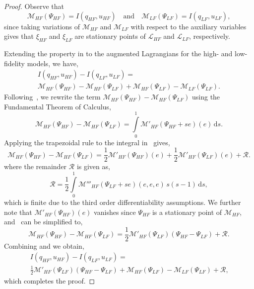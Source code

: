 \begin{proof}
%
Observe that
%
\begin{equation}
\label{eq:MeqI}
\mathcal{M}_{HF}(\Psi_{HF})=I(q_{HF},u_{HF})\quad\textrm{and}\quad\mathcal{M}_{LF}(\Psi_{LF})=I(q_{LF},u_{LF}),
\end{equation}
%
since taking variations of $\mathcal{M}_{HF}$ and $\mathcal{M}_{LF}$ with respect to the auxiliary variables gives that $\xi_{HF}$ and $\xi_{LF}$ are stationary points of $\mathcal{L}_{HF}$ and $\mathcal{L}_{LF}$, respectively.

Extending the property in  to the augmented Lagrangians for the high- and low-fidelity models, we have,
%
\begin{multline}
\label{eq:repIwithM}
I(q_{HF},u_{HF})-I(q_{LF},u_{LF})=\\\mathcal{M}_{HF}(\Psi_{HF})-\mathcal{M}_{HF}(\Psi_{LF})+\mathcal{M}_{HF}(\Psi_{LF})-\mathcal{M}_{LF}(\Psi_{LF})\textrm{.}
\end{multline}
%
Following~\cite{BecVex05}, we rewrite the term $\mathcal{M}_{HF}(\Psi_{HF})-\mathcal{M}_{HF}(\Psi_{LF})$ using the Fundamental Theorem of Calculus,
%
\begin{equation}
\label{eq:Mantiderivative}
\mathcal{M}_{HF}(\Psi_{HF})-\mathcal{M}_{HF}(\Psi_{LF}) = \int\limits_{0}^{1} \mathcal{M}'_{HF}\left(\Psi_{HF} + se\right)\left(e\right) \, \textrm{d}s.
\end{equation}
%
Applying the trapezoidal rule to the integral in~ gives,
%
\begin{equation}
\label{eq:Mprimetrapezoid}
\mathcal{M}_{HF}(\Psi_{HF})-\mathcal{M}_{HF}(\Psi_{LF}) = \frac{1}{2}\mathcal{M}'_{HF}(\Psi_{HF})(e) + \frac{1}{2}\mathcal{M}'_{HF}(\Psi_{LF})(e) + \mathcal{R}\textrm{.}
\end{equation}
%
where the remainder $\mathcal{R}$ is given as,
%
\begin{equation}
\label{eq:trapezoidremainder}
\mathcal{R} = \frac{1}{2} \int\limits_{0}^{1} \mathcal{M}'''_{HF}\left(\Psi_{LF} + se\right)(e,e,e) \, s(s-1) \, \textrm{d}s,
\end{equation}
%
which is finite due to the third order differentiability assumptions. We further note that $\mathcal{M}'_{HF}(\Psi_{HF})(e)$ vanishes since $\Psi_{HF}$ is a stationary point of $\mathcal{M}_{HF}$, and~ can be simplified to,
%
\begin{equation}
\label{eq:beckvex}
\mathcal{M}_{HF}(\Psi_{HF})-\mathcal{M}_{HF}(\Psi_{LF}) = \frac{1}{2}\mathcal{M}'_{HF}(\Psi_{LF})(\Psi_{HF}-\Psi_{LF})+\mathcal{R}\textrm{.}
\end{equation}
%
Combining  and  we obtain,
%
\begin{multline}
\label{eq:preadj}
I(q_{HF},u_{HF})-I(q_{LF},u_{LF})=\\\frac{1}{2}\mathcal{M}'_{HF}(\Psi_{LF})(\Psi_{HF}-\Psi_{LF})+\mathcal{M}_{HF}(\Psi_{LF})-\mathcal{M}_{LF}(\Psi_{LF})+\mathcal{R}\textrm{,}
\end{multline}
which completes the proof.
\end{proof}
%

